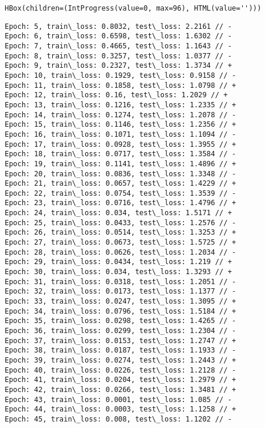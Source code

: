 \documentclass[11pt]{article}
\begin{document}
    
    \begin{verbatim}
HBox(children=(IntProgress(value=0, max=96), HTML(value='')))
    \end{verbatim}

    
    \begin{Verbatim}[commandchars=\\\{\}]
Epoch: 5, train\_loss: 0.8032, test\_loss: 2.2161 // -
Epoch: 6, train\_loss: 0.6598, test\_loss: 1.6302 // -
Epoch: 7, train\_loss: 0.4665, test\_loss: 1.1643 // -
Epoch: 8, train\_loss: 0.3257, test\_loss: 1.0377 // -
Epoch: 9, train\_loss: 0.2327, test\_loss: 1.3734 // +
Epoch: 10, train\_loss: 0.1929, test\_loss: 0.9158 // -
Epoch: 11, train\_loss: 0.1858, test\_loss: 1.0798 // +
Epoch: 12, train\_loss: 0.16, test\_loss: 1.2029 // +
Epoch: 13, train\_loss: 0.1216, test\_loss: 1.2335 // +
Epoch: 14, train\_loss: 0.1274, test\_loss: 1.2078 // -
Epoch: 15, train\_loss: 0.1146, test\_loss: 1.2356 // +
Epoch: 16, train\_loss: 0.1071, test\_loss: 1.1094 // -
Epoch: 17, train\_loss: 0.0928, test\_loss: 1.3955 // +
Epoch: 18, train\_loss: 0.0717, test\_loss: 1.3584 // -
Epoch: 19, train\_loss: 0.1141, test\_loss: 1.4896 // +
Epoch: 20, train\_loss: 0.0836, test\_loss: 1.3348 // -
Epoch: 21, train\_loss: 0.0657, test\_loss: 1.4229 // +
Epoch: 22, train\_loss: 0.0754, test\_loss: 1.3539 // -
Epoch: 23, train\_loss: 0.0716, test\_loss: 1.4796 // +
Epoch: 24, train\_loss: 0.034, test\_loss: 1.5171 // +
Epoch: 25, train\_loss: 0.0433, test\_loss: 1.2576 // -
Epoch: 26, train\_loss: 0.0514, test\_loss: 1.3253 // +
Epoch: 27, train\_loss: 0.0673, test\_loss: 1.5725 // +
Epoch: 28, train\_loss: 0.0626, test\_loss: 1.2034 // -
Epoch: 29, train\_loss: 0.0434, test\_loss: 1.219 // +
Epoch: 30, train\_loss: 0.034, test\_loss: 1.3293 // +
Epoch: 31, train\_loss: 0.0318, test\_loss: 1.2051 // -
Epoch: 32, train\_loss: 0.0173, test\_loss: 1.1377 // -
Epoch: 33, train\_loss: 0.0247, test\_loss: 1.3095 // +
Epoch: 34, train\_loss: 0.0796, test\_loss: 1.5184 // +
Epoch: 35, train\_loss: 0.0298, test\_loss: 1.4265 // -
Epoch: 36, train\_loss: 0.0299, test\_loss: 1.2304 // -
Epoch: 37, train\_loss: 0.0153, test\_loss: 1.2747 // +
Epoch: 38, train\_loss: 0.0187, test\_loss: 1.1933 // -
Epoch: 39, train\_loss: 0.0274, test\_loss: 1.2443 // +
Epoch: 40, train\_loss: 0.0226, test\_loss: 1.2128 // -
Epoch: 41, train\_loss: 0.0204, test\_loss: 1.2979 // +
Epoch: 42, train\_loss: 0.0266, test\_loss: 1.3481 // +
Epoch: 43, train\_loss: 0.0001, test\_loss: 1.085 // -
Epoch: 44, train\_loss: 0.0003, test\_loss: 1.1258 // +
Epoch: 45, train\_loss: 0.008, test\_loss: 1.1202 // -

\end{Verbatim}
\end{document}
